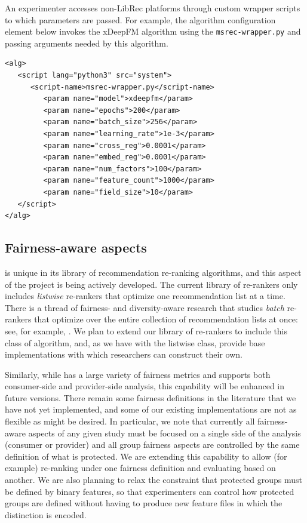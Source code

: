 An experimenter accesses non-LibRec platforms through custom wrapper scripts to which parameters are passed. For example, the algorithm configuration element below invokes the xDeepFM  algorithm using the \texttt{msrec-wrapper.py} and passing arguments needed by this algorithm.

{\small
\begin{verbatim}
<alg>
   <script lang="python3" src="system">
      <script-name>msrec-wrapper.py</script-name>
         <param name="model">xdeepfm</param>
         <param name="epochs">200</param>
         <param name="batch_size">256</param>
         <param name="learning_rate">1e-3</param>
         <param name="cross_reg">0.0001</param>
         <param name="embed_reg">0.0001</param>
         <param name="num_factors">100</param>
         <param name="feature_count">1000</param>
         <param name="field_size">10</param>
   </script>
</alg>
\end{verbatim}}

\subsection{Fairness-aware aspects}
\libauto{} is unique in its library of recommendation re-ranking algorithms, and this aspect of the project is being actively developed. The current library of re-rankers only includes \textit{listwise} re-rankers that optimize one recommendation list at a time. There is a thread of fairness- and diversity-aware research that studies \textit{batch} re-rankers that optimize over the entire collection of recommendation lists at once: see, for example, \cite{surer2018multistakeholder,patro2020fairrec,mansoury2020fairmatch}. We plan to extend our library of re-rankers to include this class of algorithm, and, as we have with the listwise class, provide base implementations with which researchers can construct their own.

Similarly, while \libauto{} has a large variety of fairness metrics and supports both consumer-side and provider-side analysis, this capability will be enhanced in future versions. There remain some fairness definitions in the literature that we have not yet implemented, and some of our existing implementations are not as flexible as might be desired. In particular, we note that currently all fairness-aware aspects of any given study must be focused on a single side of the analysis (consumer or provider) and all group fairness aspects are controlled by the same definition of what is protected. We are extending this capability to allow (for example) re-ranking under one fairness definition and evaluating based on another. We are also planning to relax the constraint that protected groups must be defined by binary features, so that experimenters can control how protected groups are defined without having to produce new feature files in which the distinction is encoded. 


